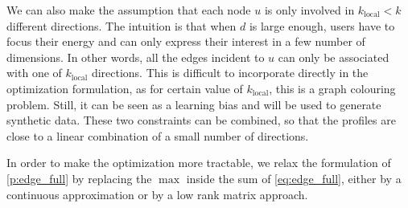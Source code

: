We can also make the assumption that each node $u$ is only involved in $k_\mathrm{local} < k$
different directions. The intuition is that when $d$ is large enough, users have to focus their
energy and can only express their interest in a few number of dimensions. In other words, all the
edges incident to $u$ can only be associated with one of $k_\mathrm{local}$ directions. This is
difficult to incorporate directly in the optimization formulation, as for certain value of
$k_\mathrm{local}$, this is a \NPc{} graph colouring problem. Still, it can be seen as a learning
bias and will be used to generate synthetic data.
These two constraints can be combined, so that the profiles are close to a linear combination of a
small number of directions.


\bigskip

In order to make the optimization more tractable, we relax the formulation of \autoref{p:edge_full}
by replacing the $\max$ inside the sum of \eqref{eq:edge_full}, either by a continuous approximation
or by a low rank matrix approach.

